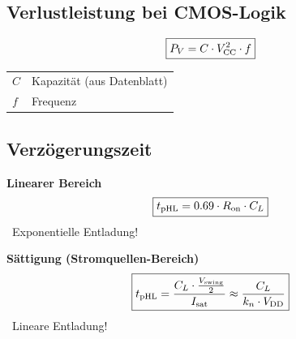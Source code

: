 \subsection{Verlustleistung bei CMOS-Logik}

\begin{minipage}[c]{0.48\columnwidth}
    $$ \boxed{ P_V = C \cdot V_{\rm CC}^2 \cdot f} $$
\end{minipage}
\hfill
\begin{minipage}[c]{0.48\columnwidth}
    \begin{tabular}{ll}
        $C$ & Kapazität (aus Datenblatt) \\
        $f$ & Frequenz 
    \end{tabular}
\end{minipage}


\subsection{Verzögerungszeit}

\begin{minipage}[t]{0.48\columnwidth}
    \textbf{Linearer Bereich}
    $$ \boxed{t_{\rm pHL} = 0.69 \cdot R_{\rm on} \cdot C_L} $$
    \textrightarrow\ Exponentielle Entladung! 
\end{minipage}
\hfill
\begin{minipage}[t]{0.48\columnwidth}
    \textbf{Sättigung (Stromquellen-Bereich)}
    $$ \boxed{t_{\rm pHL} = \frac{C_L \cdot \frac{V_{\rm swing}}{2}}{I_{\rm sat}} \approx \frac{C_L}{k_n \cdot V_{\rm DD}} }$$
    \textrightarrow\ Lineare Entladung!
\end{minipage}


